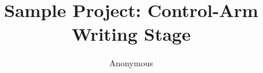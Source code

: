 \documentclass{article}
\title{Sample Project: Control-Arm Writing Stage}
\author{Anonymous}
\date{}
\begin{document}
\maketitle
\begin{abstract}

\end{abstract}










\end{document}
